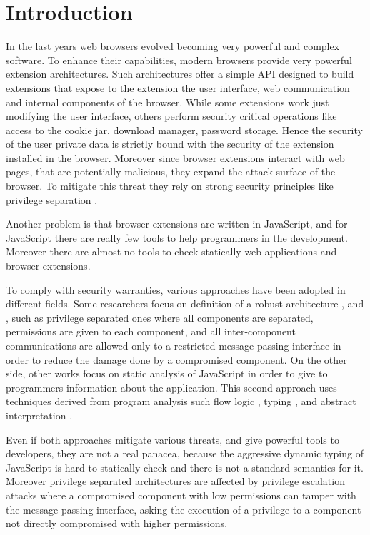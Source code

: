 \section{Introduction}
In the last years web browsers evolved becoming very powerful and complex software. To enhance their capabilities, modern browsers provide very powerful extension architectures. Such architectures offer a simple API designed to build extensions that expose to the extension the user interface, web communication and internal components of the browser. While some extensions work just modifying the user interface, others perform security critical operations like access to the cookie jar, download manager, password storage. Hence the security of the user private data is strictly bound with the security of the extension installed in the browser. Moreover since browser extensions interact with web pages, that are potentially malicious, they expand the attack surface of the browser. To mitigate this threat they rely on strong security principles like privilege separation \cite{ChromeExtSpec}.

Another problem is that browser extensions are written in JavaScript, and for JavaScript there are really few tools to help programmers in the development. Moreover there are almost no tools to check statically web applications and browser extensions.

To comply with security warranties, various approaches have been adopted in different fields. Some researchers focus on definition of a robust architecture \cite{ChromeExtSpec}, \cite{ChromeExtSpecSnd} and \cite{PriviSep}, such as privilege separated ones where all components are separated, permissions are given to each component, and all inter-component communications are allowed only to a restricted message passing interface in order to reduce the damage done by a compromised component. On the other side, other works focus on static analysis of JavaScript in order to give to programmers information about the application. This second approach uses techniques derived from program analysis \cite{PrincipleProgramAnalysis} such flow logic \cite{FlowLogic}, typing \cite{TAJS} \cite{strobe}, and abstract interpretation \cite{LambdaJSMightVanHorn}.

Even if both approaches mitigate various threats, and give powerful tools to developers, they are not a real panacea, because the aggressive dynamic typing of JavaScript is hard to statically check and there is not a standard semantics for it. Moreover privilege separated architectures are affected by privilege escalation attacks where a compromised component with low permissions can tamper with the message passing interface, asking the execution of a privilege to a component not directly compromised with higher permissions.

